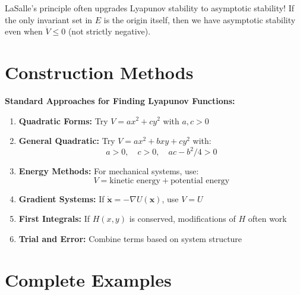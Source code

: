 \documentclass[12pt]{article}
\begin{document}
\begin{insight}
LaSalle's principle often upgrades Lyapunov stability to asymptotic stability! If the only invariant set in $E$ is the origin itself, then we have asymptotic stability even when $\dot{V} \leq 0$ (not strictly negative).
\end{insight}

\section{Construction Methods}

\begin{construction}
\textbf{Standard Approaches for Finding Lyapunov Functions:}

\begin{enumerate}
    \item \textbf{Quadratic Forms:} Try $V = ax^2 + cy^2$ with $a, c > 0$

    \item \textbf{General Quadratic:} Try $V = ax^2 + bxy + cy^2$ with:
    $$a > 0, \quad c > 0, \quad ac - b^2/4 > 0$$

    \item \textbf{Energy Methods:} For mechanical systems, use:
    $$V = \text{kinetic energy} + \text{potential energy}$$

    \item \textbf{Gradient Systems:} If $\dot{\mathbf{x}} = -\nabla U(\mathbf{x})$, use $V = U$

    \item \textbf{First Integrals:} If $H(x,y)$ is conserved, modifications of $H$ often work

    \item \textbf{Trial and Error:} Combine terms based on system structure
\end{enumerate}
\end{construction}

\section{Complete Examples}
\end{document}
